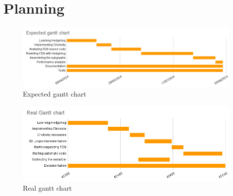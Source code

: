 
\section{Planning}

\begin{figure}[h!]
  \begin{center}
    \includegraphics[scale=0.5]{img/expected-gantt-chart.png}
    \caption{Expected gantt chart}
    \label{fig:expectedgantt}
  \end{center}
\end{figure}

\begin{figure}[h!]
  \begin{center}
    \includegraphics[scale=0.5]{img/real-gantt-chart.png}
    \caption{Real gantt chart}
    \label{fig:realgantt}
  \end{center}
\end{figure}
